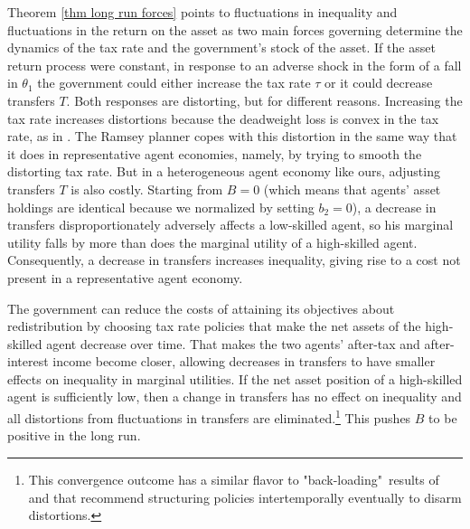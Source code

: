 \documentclass[thmsb,11pt]{article}
\begin{document}
Theorem \ref{thm long run forces}  points to fluctuations in inequality and fluctuations in the return on the asset as two main forces governing  determine the dynamics of the  tax rate
and the government's stock of the asset. If the  asset return process were constant, in response  to an adverse  shock in the form of a fall in $\theta_1$
the government could either increase the  tax rate $%
\tau $ or it could decrease transfers $T.$ Both  responses are distorting,
but for different reasons. Increasing the tax rate increases distortions because the deadweight loss is convex in the tax rate,
 as in \cite{Barro1979}. The Ramsey planner copes with this distortion  %
  in the same way that it does in  representative agent economies, namely, by trying to smooth the distorting tax rate.
 \color{black}
 But in a  heterogeneous agent economy like ours,  adjusting transfers $T$ is
also costly. Starting from $B=0$ (which means that    agents' asset holdings are identical  because we normalized by setting $b_2=0$),
a decrease in transfers  disproportionately adversely
affects a low-skilled agent, so his marginal utility
falls by more than does the marginal utility of a high-skilled agent. Consequently, a
decrease in transfers increases inequality, giving rise to a cost  not present in a representative agent economy.

The government can reduce the costs of  attaining its objectives about  redistribution  by choosing
tax rate policies that make the net assets of  the high-skilled agent
decrease over time. That makes the two agents'
after-tax and after-interest income  become closer, allowing decreases in transfers to have smaller effects on inequality in
marginal utilities. If the net asset position of a high-skilled agent is
sufficiently low, then a change in transfers has no effect on inequality and
all  distortions from fluctuations in transfers are eliminated.\footnote{This convergence outcome has
 a similar flavor to "back-loading"\ results  of
 \cite{Ray2002} and \cite{Albanesi2012} that recommend structuring policies intertemporally eventually to disarm  distortions.} This pushes $B$ to be positive in the long run.




%
\end{document}
